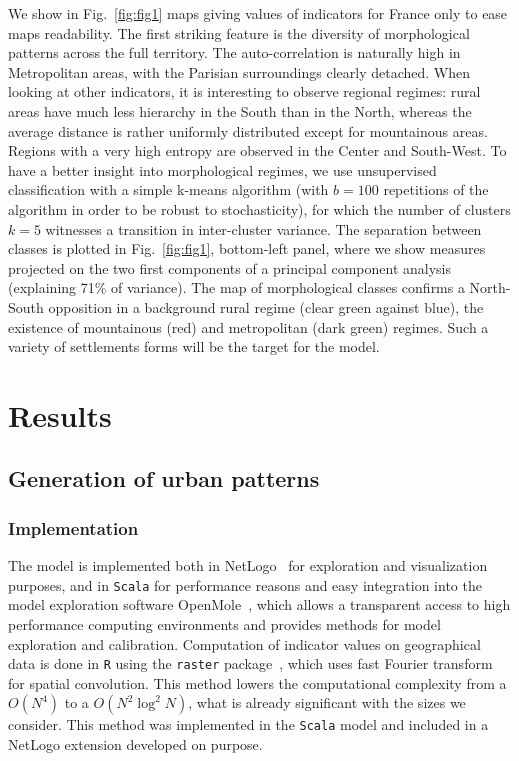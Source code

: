\documentclass[10pt,letterpaper]{article}
\begin{document}
We show in Fig.~\ref{fig:fig1} maps giving values of indicators for France only to ease maps readability. The first striking feature is the diversity of morphological patterns across the full territory. The auto-correlation is naturally high in Metropolitan areas, with the Parisian surroundings clearly detached. When looking at other indicators, it is interesting to observe regional regimes: rural areas have much less hierarchy in the South than in the North, whereas the average distance is rather uniformly distributed except for mountainous areas. Regions with a very high entropy are observed in the Center and South-West. To have a better insight into morphological regimes, we use unsupervised classification with a simple k-means algorithm (with $b=100$ repetitions of the algorithm in order to be robust to stochasticity), for which the number of clusters $k=5$ witnesses a transition in inter-cluster variance. The separation between classes is plotted in Fig.~\ref{fig:fig1}, bottom-left panel, where we show measures projected on the two first components of a principal component analysis (explaining 71\% of variance). The map of morphological classes confirms a North-South opposition in a background rural regime (clear green against blue), the existence of mountainous (red) and metropolitan (dark green) regimes. Such a variety of settlements forms will be the target for the model.






\section*{Results}



\subsection*{Generation of urban patterns}


\subsubsection*{Implementation}


The model is implemented both in NetLogo~\cite{wilensky1999netlogo} for exploration and visualization purposes, and in \texttt{Scala} for performance reasons and easy integration into the model exploration software OpenMole~\cite{reuillon2013openmole}, which allows a transparent access to high performance computing environments and provides methods for model exploration and calibration. Computation of indicator values on geographical data is done in \texttt{R} using the \texttt{raster} package~\cite{hijmans2015geographic}, which uses fast Fourier transform for spatial convolution. This method lowers the computational complexity from a $O(N^4)$ to a $O(N^2 \log^2 N)$, what is already significant with the sizes we consider. This method was implemented in the \texttt{Scala} model and included in a NetLogo extension developed on purpose.
\end{document}
